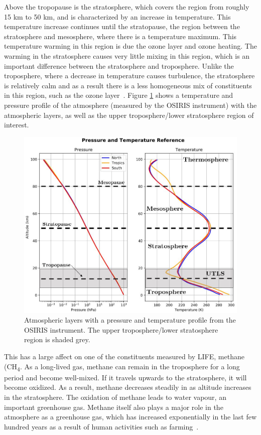 Above the tropopause is the stratosphere, which covers the region from roughly 15 km to 50 km, and is characterized by an increase in temperature. This temperature increase continues until the stratopause, the region between the stratosphere and mesosphere, where there is a temperature maximum. This temperature warming in this region is due the ozone layer and ozone heating. The warming in the stratosphere causes very little mixing in this region, which is an important difference between the stratosphere and troposphere. Unlike the troposphere, where a decrease in temperature causes turbulence, the stratosphere is relatively calm and as a result there is a less homogeneous mix of constituents in this region, such as the ozone layer~\citep{atmos_science}. Figure \ref{fig:atm_layers} shows a temperature and pressure profile of the atmosphere (measured by the OSIRIS instrument) with the atmospheric layers, as well as the upper troposphere/lower stratosphere region of interest.

 \begin{figure}
\centering
  \includegraphics[width=\linewidth]{chap2_images/atmospheric_layers.JPG}
  \caption{Atmospheric layers with a pressure and temperature profile from the OSIRIS instrument. The upper troposphere/lower stratosphere region is shaded grey.}
  \label{fig:atm_layers}
\end{figure}

 This has a large affect on one of the constituents measured by LIFE, methane (CH\textsubscript{4}. As a long-lived gas, methane can remain in the troposphere for a long period and become well-mixed. If it travels upwards to the stratosphere, it will become oxidized. As a result, methane decreases steadily in as altitude increases in the stratosphere. The oxidation of methane leads to water vapour, an important greenhouse gas. Methane itself also plays a major role in the atmosphere as a greenhouse gas, which has increased exponentially in the last few hundred years as a result of human activities such as farming~\citep{atmos_phys_and_climate}. 

